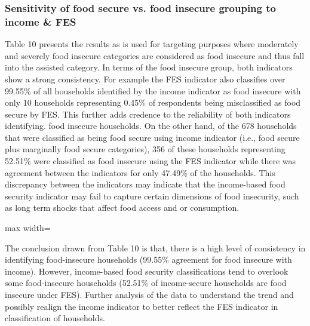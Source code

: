 \documentclass[11pt,harvard]{article}
\begin{document}
	\subsubsection{Sensitivity of food secure vs. food insecure grouping to income \& FES}
	
	Table 10 presents the results as is used for targeting purposes where moderately and severely food insecure categories are considered as food insecure and thus fall into the assisted category. In terms of the food insecure group, both indicators show a strong consistency. For example the FES indicator also classifies over 99.55\% of all households identified by the income indicator as food insecure with only 10 households representing 0.45\% of respondents being misclassified as food secure by FES. This further adds credence to the reliability  of both indicators identifying. food insecure households.
	On the other hand, of the 678 households that were classified as being food secure using income indicator (i.e., food secure plus marginally food secure categories), 356 of these households representing 52.51\% were classified as food insecure using the FES indicator while there was agreement between the indicators for only 47.49\% of the households.
	This discrepancy between the indicators may indicate that the income-based food security indicator may fail to capture certain dimensions of food insecurity, such as long term shocks that affect food access and or consumption.
	
	\begin{table}[htbp]
		\centering
		\begin{adjustbox}{max width=\textwidth}
			\begin{threeparttable}
				\caption{Cross Tabulation of Acute Food Insecurity (CAR\_FES vs. CARI\_Income)}
				\scriptsize
				 
				\label{tab:BF_FS_Cross_Tabulation}
			\end{threeparttable}
		\end{adjustbox}
	\end{table}
	
	The conclusion drawn from Table 10 is that, there is a high level of consistency in identifying food-insecure households (99.55\% agreement for food insecure with income). However, income-based food security classifications tend to overlook some food-insecure households (52.51\% of income-secure households are food insecure under FES). Further analysis of the data to understand the trend and possibly realign the income indicator to better reflect the FES indicator in classification of households.
	
\end{document}

